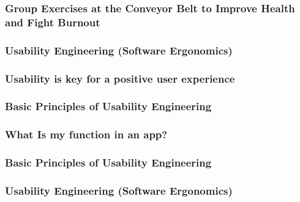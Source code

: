 \subsubsection{Group Exercises at the Conveyor Belt to Improve Health and Fight Burnout}
\subsubsection{Usability Engineering (Software Ergonomics)}
\subsubsection{Usability is key for a positive user experience}
\subsubsection{Basic Principles of Usability Engineering}
\subsubsection{What Is my function in an app?}
\subsubsection{Basic Principles of Usability Engineering}
\subsubsection{Usability Engineering (Software Ergonomics)}
